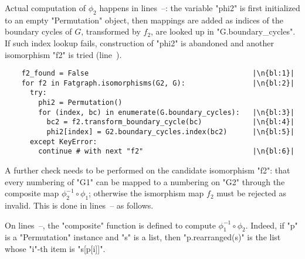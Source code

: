 Actual computation of $\phi_2$ happens in lines~--:
the variable "phi2" is first initialized to an empty "Permutation"
object, then mappings are added as indices of the boundary cycles of
$G$, transformed by $f_2$, are looked up in "G.boundary_cycles".  If
such index lookup fails, construction of "phi2" is abandoned and
another isomorphism "f2" is tried (line~).
\begin{lstlisting}
    f2_found = False                                       |\n{bl:1}|
    for f2 in Fatgraph.isomorphisms(G2, G):                |\n{bl:2}|
      try:
        phi2 = Permutation()
        for (index, bc) in enumerate(G.boundary_cycles):   |\n{bl:3}|
          bc2 = f2.transform_boundary_cycle(bc)            |\n{bl:4}|
          phi2[index] = G2.boundary_cycles.index(bc2)      |\n{bl:5}|
      except KeyError:                                     
        continue # with next "f2"                          |\n{bl:6}|

\end{lstlisting}

A further check needs to be performed on the candidate isomorphism
"f2": that every numbering of "G1" can be mapped to a
numbering on "G2" through the composite map $\phi_2^{-1} \circ
\phi_1$; otherwise the ismorphism map $f_2$ must be rejected as
invalid.  This is done in
lines~-- as follows.

On lines~--, the "composite" function is defined to
compute $\phi_1^{-1} \circ \phi_2$.  Indeed, if "p" is a "Permutation"
instance and "s" is a list, then "p.rearranged(s)" is the list whose
"i"-th item is "s[p[i]]".

